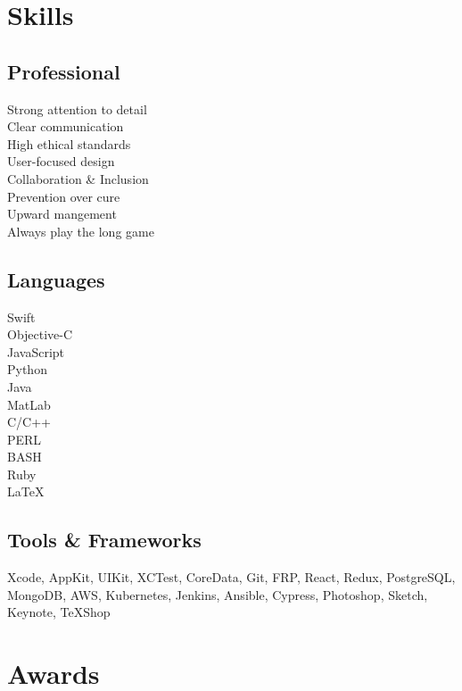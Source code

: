\documentclass[]{jhearn-resume}
\begin{document}
\begin{minipage}[t]{0.30\textwidth} 

\section{Skills}
\sectionsep
\subsection{Professional}
Strong attention to detail \\
Clear communication \\
High ethical standards \\
User-focused design \\
Collaboration \& Inclusion \\
Prevention over cure \\
Upward mangement \\
Always play the long game \\

\subsection{Languages}
Swift \\
Objective-C \\
JavaScript \\
Python \\
Java \\
MatLab \\
C/C++ \\
PERL \\
BASH \\
Ruby \\
{\LaTeX}\\


\subsection{Tools \& Frameworks}
\raggedright Xcode, AppKit, UIKit, XCTest, CoreData, Git, FRP, React, Redux, PostgreSQL, MongoDB, AWS, Kubernetes, Jenkins, Ansible, Cypress, Photoshop, Sketch, Keynote, TeXShop
\sectionsep

\section{Awards}

\end{minipage}
\end{document}
